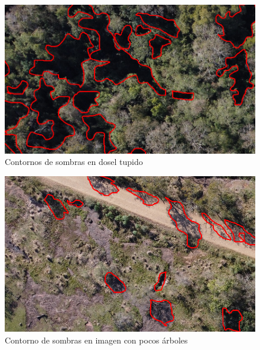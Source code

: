 \begin{figure}
    \includegraphics[width=\textwidth]{Imagenes/contours.png}
     \hfill
     \caption{Contornos de sombras en dosel tupido}
    \label{contorno1}
\end{figure}

\begin{figure}
    \includegraphics[width=\textwidth]{Imagenes/contours2.png}
     \hfill
     \caption{Contorno de sombras en imagen con pocos árboles}
    \label{contorno2}
\end{figure}

